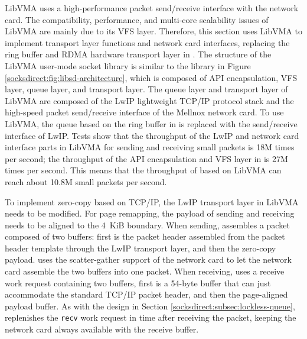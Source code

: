 LibVMA uses a high-performance packet send/receive interface with the network card. The compatibility, performance, and multi-core scalability issues of LibVMA are mainly due to its VFS layer. Therefore, this section uses LibVMA to implement transport layer functions and network card interfaces, replacing the ring buffer and RDMA hardware transport layer in \libipc{}. The structure of the LibVMA \cite{libvma} user-mode socket library is similar to the \libipc{} library in Figure \ref{socksdirect:fig:libsd-architecture}, which is composed of API encapsulation, VFS layer, queue layer, and transport layer. The queue layer and transport layer of LibVMA are composed of the LwIP lightweight TCP/IP protocol stack and the high-speed packet send/receive interface of the Mellnox network card. To use LibVMA, the queue based on the ring buffer in \libipc{} is replaced with the send/receive interface of LwIP. Tests show that the throughput of the LwIP and network card interface parts in LibVMA for sending and receiving small packets is 18M times per second; the throughput of the API encapsulation and VFS layer in \libipc{} is 27M times per second. This means that the throughput of \libipc{} based on LibVMA can reach about 10.8M small packets per second.

To implement zero-copy based on TCP/IP, the LwIP transport layer in LibVMA needs to be modified. For page remapping, the payload of sending and receiving needs to be aligned to the 4~KiB boundary. When sending, \libipc{} assembles a packet composed of two buffers: first is the packet header assembled from the packet header template through the LwIP transport layer, and then the zero-copy payload. \libipc{} uses the scatter-gather support of the network card to let the network card assemble the two buffers into one packet. When receiving, \libipc{} uses a receive work request containing two buffers, first is a 54-byte buffer that can just accommodate the standard TCP/IP packet header, and then the page-aligned payload buffer. As with the design in Section \ref{socksdirect:subsec:lockless-queue}, \libipc{} replenishes the \texttt{recv} work request in time after receiving the packet, keeping the network card always available with the receive buffer.

